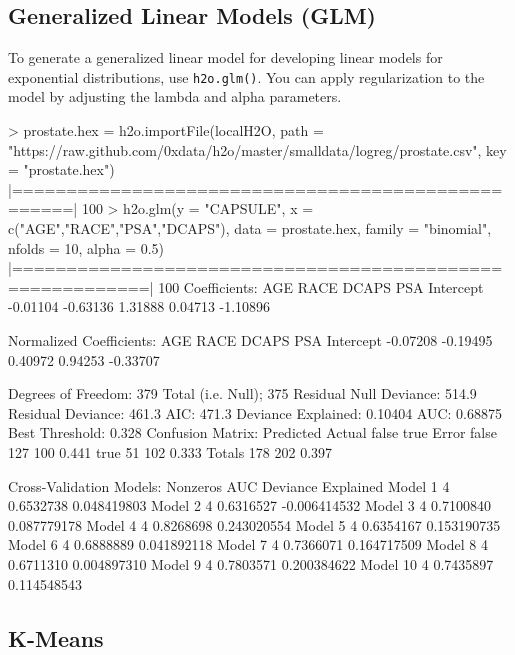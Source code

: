 \documentclass[11pt]{article}
\begin{document}
\subsection{Generalized Linear Models (GLM)}

To generate a generalized linear model for developing linear models for exponential distributions, use {\texttt{h2o.glm()}}. You can apply regularization to the model by adjusting the lambda and alpha parameters.  
\begin{spverbatim}
> prostate.hex = h2o.importFile(localH2O, path =
"https://raw.github.com/0xdata/h2o/master/smalldata/logreg/prostate.csv",
key = "prostate.hex")
       |===================================================| 100%
> h2o.glm(y = "CAPSULE", x = c("AGE","RACE","PSA","DCAPS"), data =
prostate.hex, family = "binomial", nfolds = 10, alpha = 0.5)
 |==========================================================| 100%
     Coefficients:
    AGE      RACE     DCAPS       PSA Intercept
       -0.01104  -0.63136   1.31888   0.04713  -1.10896

      Normalized Coefficients:
    AGE      RACE     DCAPS       PSA Intercept
       -0.07208  -0.19495   0.40972   0.94253  -0.33707

      Degrees of Freedom: 379 Total (i.e. Null);  375 Residual
      Null Deviance:     514.9
      Residual Deviance: 461.3  AIC: 471.3
      Deviance Explained: 0.10404
      AUC: 0.68875  Best Threshold: 0.328
    	Confusion Matrix:
      Predicted
      Actual   false true Error
      false    127  100 0.441
      true      51  102 0.333
      Totals   178  202 0.397

      Cross-Validation Models:
       Nonzeros       AUC Deviance Explained
      Model 1         4 0.6532738        0.048419803
      Model 2         4 0.6316527       -0.006414532
      Model 3         4 0.7100840        0.087779178
      Model 4         4 0.8268698        0.243020554
      Model 5         4 0.6354167        0.153190735
      Model 6         4 0.6888889        0.041892118
      Model 7         4 0.7366071        0.164717509
      Model 8         4 0.6711310        0.004897310
      Model 9         4 0.7803571        0.200384622
      Model 10        4 0.7435897        0.114548543
\end{spverbatim}

\subsection{K-Means}
\end{document}
